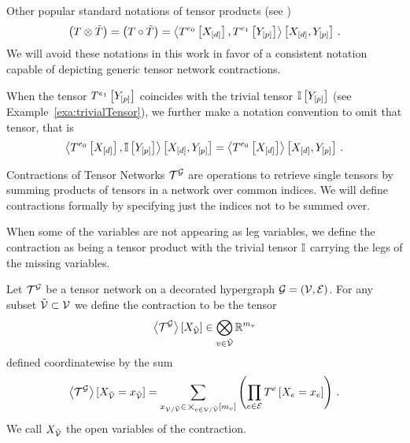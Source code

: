 Other popular standard notations of tensor products (see \cite{kolda_tensor_2009,hackbusch_tensor_2012,cichocki_tensor_2015})
	\[ \left(T \otimes \tilde{T}\right) = \left(T \circ \tilde{T}\right)
	= \left\langle T^{e_0}\left[X_{[d]}\right],T^{e_1}\left[Y_{[p]}\right]\right\rangle \left[ X_{[d]},Y_{[p]} \right]  \, . \]
We will avoid these notations in this work in favor of a consistent notation capable of depicting generic tensor network contractions.

When the tensor $T^{e_1}\left[Y_{[p]}\right]$ coincides with the trivial tensor $\mathbb{I}\left[Y_{[p]}\right]$ (see Example~\ref{exa:trivialTensor}), we further make a notation convention to omit that tensor, that is
\begin{align*}
	\left\langle T^{e_0}\left[X_{[d]}\right],\mathbb{I}\left[Y_{[p]}\right]\right\rangle \left[ X_{[d]},Y_{[p]} \right]
	= \left\langle T^{e_0}\left[X_{[d]}\right]\right\rangle \left[ X_{[d]},Y_{[p]} \right] \, .
\end{align*}




Contractions of Tensor Networks $\mathcal{T}^{\mathcal{G}}$ are operations to retrieve single tensors by summing products of tensors in a network over common indices.
We will define contractions formally by specifying just the indices not to be summed over.

When some of the variables are not appearing as leg variables, we define the contraction as being a tensor product with the trivial tensor $\mathbb{I}$ carrying the legs of the missing variables.

\begin{definition}\label{def:contraction}
	Let $\mathcal{T}^{\mathcal{G}}$ be a tensor network on a decorated hypergraph $\mathcal{G}=(\mathcal{V},\mathcal{E})$.
	For any subset $\tilde{\mathcal{V}}\subset\mathcal{V}$ we define the contraction  to be the tensor
	\begin{align}
		\left\langle \mathcal{T}^{\mathcal{G}}\right\rangle \left[ X_{\tilde{\mathcal{V}}} \right] \in \bigotimes_{v\in\tilde{\mathcal{V}}} \mathbb{R}^{m_{v}}
	\end{align}
	defined coordinatewise by the sum
	\begin{align}
		\left\langle \mathcal{T}^{\mathcal{G}}\right\rangle \left[ X_{\tilde{\mathcal{V}}}=x_{\tilde{\mathcal{V}}} \right] =
		\sum_{x_{\mathcal{V}/\tilde{\mathcal{V}}} \in\,\bigtimes_{v\in\mathcal{V}/\tilde{\mathcal{V}}}[m_{v}]}
		\left( \prod_{e\in\mathcal{E}}T^{e}\left[X_{e}=x_{e}\right] \right) \, .
	\end{align}
	We call $X_{\tilde{\mathcal{V}}}$ the open variables of the contraction.
\end{definition}

